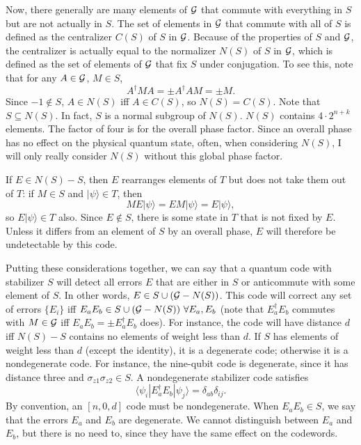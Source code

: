 \documentclass{report}
\newcommand{\G}{{\cal G}}
\newcommand{\ket}[1]{|{#1}\rangle}
\newcommand{\bra}[1]{\langle{#1}|}
\newcommand{\Zs}[1]{\sigma_{z{#1}}}
\begin{document}
Now, there generally are many elements of $\G$ that commute with 
everything in $S$ but are not actually in $S$.  The set of elements in $\G$ 
that commute with all of $S$ is defined as the centralizer $C(S)$ of $S$ in 
$\G$.  Because of the properties of $S$ and $\G$, the centralizer is actually 
equal to the normalizer $N(S)$ of $S$ in $\G$, which is defined as the set of 
elements of $\G$ that fix $S$ under conjugation.  To see this, note that for
any $A \in \G$, $M \in S$, 
\begin{equation}
A^\dagger M A = \pm A^\dagger A M = \pm M.
\end{equation}
Since $-1 \notin S$, $A \in N(S)$ iff $A \in C(S)$, so $N(S) = C(S)$.  Note 
that $S \subseteq N(S)$.  In fact, $S$ is a normal subgroup of $N(S)$.  
$N(S)$ contains $4 \cdot 2^{n+k}$ elements.  The factor of four is for the 
overall phase factor.  Since an overall phase has no effect on the physical
quantum state, often, when considering $N(S)$, I will only really 
consider $N(S)$ without this global phase factor.

If $E \in N(S)-S$, then $E$ rearranges elements of $T$ but does not take 
them out of $T$: if $M \in S$ and $\ket{\psi} \in T$, then
\begin{equation}
M E \ket{\psi} = EM \ket{\psi} = E \ket{\psi},
\end{equation}
so $E \ket{\psi} \in T$ also.  Since $E \notin S$, there is some state in $T$ 
that is not fixed by $E$.  Unless it differs from an element of $S$ by an 
overall phase, $E$ will therefore be undetectable by this code.

Putting these considerations together, we can say that a quantum code 
with stabilizer $S$ will detect all errors $E$ that are either in $S$ or 
anticommute with some element of $S$.  In other words, $E \in S \cup (\G - 
N(S))$.  This code will correct any set of errors $\{ E_i \}$ iff $E_a E_b \in 
S \cup (\G - N(S)) \ \forall E_a, E_b$ (note that $E_a^\dagger E_b$ commutes 
with $M \in \G$ iff $E_a E_b = \pm E_a^\dagger E_b$ does).  For instance, the 
code will have distance $d$ iff $N(S) - S$ contains no elements of weight less 
than $d$.  If $S$ has elements of weight less than $d$ (except the identity), 
it is a degenerate code; otherwise it is a nondegenerate code.  For instance, 
the nine-qubit code is degenerate, since it has distance three and $\Zs{1} 
\Zs{2} \in S$.  A nondegenerate stabilizer code satisfies
\begin{equation}
\bra{\psi_i} E_a^\dagger E_b \ket{\psi_j} = \delta_{ab} \delta_{ij}.
\end{equation}
By convention, an $[n, 0, d]$ code must be nondegenerate.  When $E_a E_b \in S$,
we say that the errors $E_a$ and $E_b$ are degenerate.  We cannot distinguish
between $E_a$ and $E_b$, but there is no need to, since they have the same
effect on the codewords.
\end{document}
